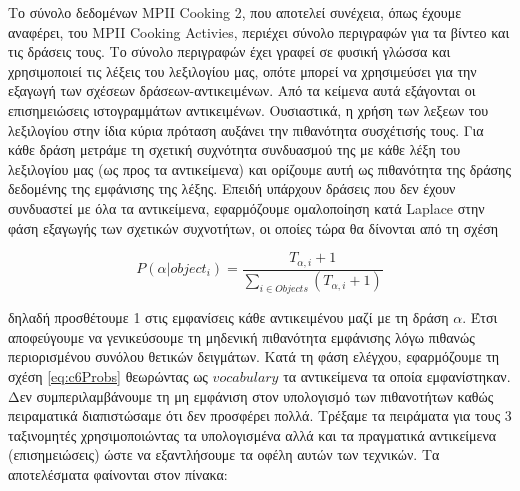 \documentclass[11pt,a4paper,english,greek,twoside]{../Thesis}
\begin{document}
\par Το σύνολο δεδομένων MPII Cooking 2, που αποτελεί συνέχεια, όπως έχουμε αναφέρει, του MPII Cooking Activies, περιέχει σύνολο περιγραφών για τα βίντεο και τις δράσεις τους. Το σύνολο περιγραφών έχει γραφεί σε φυσική γλώσσα και χρησιμοποιεί τις λέξεις του λεξιλογίου μας, οπότε μπορεί να χρησιμεύσει για την εξαγωγή των σχέσεων δράσεων-αντικειμένων. Από τα κείμενα αυτά εξάγονται οι επισημειώσεις ιστογραμμάτων αντικειμένων. Ουσιαστικά, η χρήση των λεξεων του λεξιλογίου στην ίδια κύρια πρόταση αυξάνει την πιθανότητα συσχέτισής τους. Για κάθε δράση μετράμε τη σχετική συχνότητα συνδυασμού της με κάθε λέξη του λεξιλογίου μας (ως προς τα αντικείμενα) και ορίζουμε αυτή ως πιθανότητα της δράσης δεδομένης της εμφάνισης της λέξης. Επειδή υπάρχουν δράσεις που δεν έχουν συνδυαστεί με όλα τα αντικείμενα, εφαρμόζουμε ομαλοποίηση κατά Laplace στην φάση εξαγωγής των σχετικών συχνοτήτων, οι οποίες τώρα θα δίνονται από τη σχέση

\begin{equation}\label{eq:c6Probs2}
    P(\alpha | object_i)=\frac{T_{\alpha,i}+1}{\sum_{i \in Objects} (T_{\alpha,i}+1)}
\end{equation}

δηλαδή προσθέτουμε 1 στις εμφανίσεις κάθε αντικειμένου μαζί με τη δράση $\alpha$. Έτσι αποφεύγουμε να γενικεύσουμε τη μηδενική πιθανότητα εμφάνισης λόγω πιθανώς περιορισμένου συνόλου θετικών δειγμάτων. Κατά τη φάση ελέγχου, εφαρμόζουμε τη σχέση \ref{eq:c6Probs} θεωρώντας ως $vocabulary$ τα αντικείμενα τα οποία εμφανίστηκαν. Δεν συμπεριλαμβάνουμε τη μη εμφάνιση στον υπολογισμό των πιθανοτήτων καθώς πειραματικά διαπιστώσαμε ότι δεν προσφέρει πολλά. Τρέξαμε τα πειράματα για τους 3 ταξινομητές χρησιμοποιώντας τα υπολογισμένα αλλά και τα πραγματικά αντικείμενα (επισημειώσεις) ώστε να εξαντλήσουμε τα οφέλη αυτών των τεχνικών. Τα αποτελέσματα φαίνονται στον πίνακα:
\end{document}
